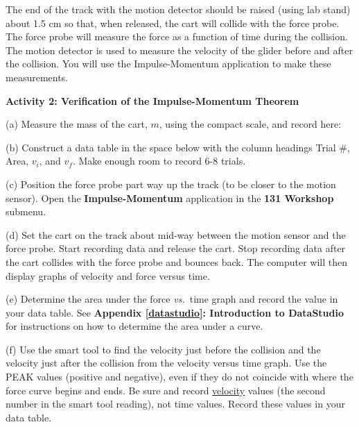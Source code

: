 The end of the track with the motion detector should be raised (using lab stand) 
about 1.5 cm so that, when released, the cart will collide with the force probe. 
The force probe will measure the force as a function of time during the collision. 
The motion detector is used to measure the velocity of the glider before and after the 
collision. You will use the Impulse-Momentum application to make these measurements.

\vspace{0.3cm}
{\par\centering {} \par}
\vspace{0.3cm}

\textbf{Activity 2: Verification of the Impulse-Momentum Theorem} 

(a) Measure the mass of the cart, $m$, using the compact scale, and record here:
\vspace{10mm}

(b) Construct a data table in the space below with the column headings Trial
\#, Area, \( v_{i} \), and \( v_{f} \). Make enough room to record 6-8 trials.

\newpage

(c) Position the force probe part way up the track (to be closer to the motion sensor). Open the \textbf{Impulse-Momentum} application in the \textbf{131 Workshop} submenu. 

(d) Set the cart on the track about mid-way between the motion sensor and the force probe. Start recording data and release the cart. Stop recording data after the cart collides with the force probe and bounces back. The computer will then display graphs of velocity and force versus time.

(e) Determine the area under the force \textit{vs.}~time graph and record the value in
your data table. See \textbf{Appendix \ref{datastudio}: Introduction to DataStudio} for instructions on how to determine the area under a curve.

(f) Use the smart tool to find the velocity just before the collision and the
velocity just after the collision from the velocity versus time graph. Use the 
PEAK values (positive and negative), even if they do not coincide with where 
the force curve begins and ends. Be sure and record \underline{velocity} values 
(the second number in the smart tool reading), not time values. 
Record these values in your data table.


